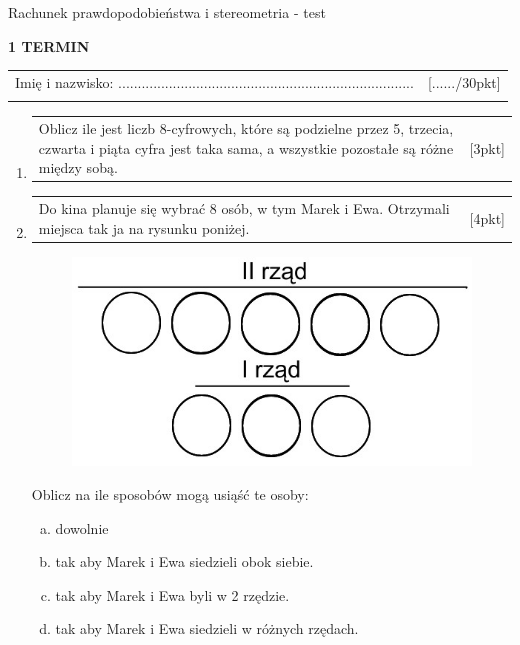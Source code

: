 \documentclass[12pt,a4paper]{article}
\begin{document}
	\begin{center}
		\LARGE Rachunek prawdopodobieństwa i stereometria - test
	\end{center}
	\vspace{1.5cm}
	\begin{flushright}
		\textbf{1 TERMIN}
	\end{flushright}
	\begin{tabular}{p{13cm} r}
		Imię i nazwisko: ............................................................................
		&[....../30pkt]\\ 
		\vspace{0.5cm}
	\end{tabular}
	\begin{enumerate}[1.]
		\item  \begin{tabular}{p{13cm} r}
			Oblicz ile jest liczb  8-cyfrowych, które są podzielne przez 5, trzecia, czwarta i piąta cyfra jest taka sama, a wszystkie pozostałe są różne między sobą.&[3pkt]\\ 
		\end{tabular}
		
		\item  \begin{tabular}{p{13cm} r}
			Do kina planuje się wybrać 8 osób, w tym Marek i Ewa. Otrzymali miejsca tak ja na rysunku poniżej.&[4pkt]\\ 
		\end{tabular}
		
		\begin{figure}[h]
			\centering
			\includegraphics[scale=0.4]{rpst1.jpeg}
		\end{figure}
		
		Oblicz na ile sposobów mogą usiąść te osoby:
		\begin{enumerate}[a)]
			\item dowolnie
			\item tak aby Marek i Ewa siedzieli obok siebie.
			\item tak aby Marek i Ewa byli w 2 rzędzie.
			\item tak aby Marek i Ewa siedzieli w różnych rzędach.
		\end{enumerate}
		

\end{enumerate}
\end{document}
